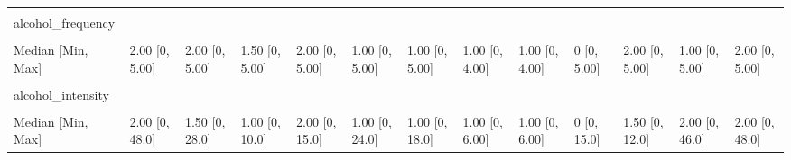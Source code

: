 \documentclass[
  single column]{article}
\begin{document}
\begin{landscape}
\begin{longtable}[t]{lllllllllllll}
\cellcolor{gray!10}{Missing} & \cellcolor{gray!10}{51 (0.2\%)} & \cellcolor{gray!10}{3 (0.2\%)} & \cellcolor{gray!10}{0 (0\%)} & \cellcolor{gray!10}{5 (0.2\%)} & \cellcolor{gray!10}{12 (0.3\%)} & \cellcolor{gray!10}{4 (0.4\%)} & \cellcolor{gray!10}{0 (0\%)} & \cellcolor{gray!10}{0 (0\%)} & \cellcolor{gray!10}{3 (0.5\%)} & \cellcolor{gray!10}{1 (0.2\%)} & \cellcolor{gray!10}{4 (0.5\%)} & \cellcolor{gray!10}{83 (0.3\%)}\\
alcohol\_frequency &  &  &  &  &  &  &  &  &  &  &  & \\
\addlinespace
\cellcolor{gray!10}{Mean (SD)} & \cellcolor{gray!10}{2.05 (1.33)} & \cellcolor{gray!10}{2.20 (1.38)} & \cellcolor{gray!10}{1.66 (1.35)} & \cellcolor{gray!10}{1.99 (1.34)} & \cellcolor{gray!10}{1.62 (1.34)} & \cellcolor{gray!10}{1.37 (1.34)} & \cellcolor{gray!10}{1.32 (1.28)} & \cellcolor{gray!10}{1.55 (1.18)} & \cellcolor{gray!10}{0.112 (0.557)} & \cellcolor{gray!10}{2.02 (1.37)} & \cellcolor{gray!10}{1.51 (1.38)} & \cellcolor{gray!10}{1.92 (1.36)}\\
Median [Min, Max] & 2.00 [0, 5.00] & 2.00 [0, 5.00] & 1.50 [0, 5.00] & 2.00 [0, 5.00] & 1.00 [0, 5.00] & 1.00 [0, 5.00] & 1.00 [0, 4.00] & 1.00 [0, 4.00] & 0 [0, 5.00] & 2.00 [0, 5.00] & 1.00 [0, 5.00] & 2.00 [0, 5.00]\\
\cellcolor{gray!10}{Missing} & \cellcolor{gray!10}{449 (2.1\%)} & \cellcolor{gray!10}{40 (2.9\%)} & \cellcolor{gray!10}{8 (3.0\%)} & \cellcolor{gray!10}{78 (3.9\%)} & \cellcolor{gray!10}{92 (2.5\%)} & \cellcolor{gray!10}{30 (2.7\%)} & \cellcolor{gray!10}{4 (2.9\%)} & \cellcolor{gray!10}{5 (5.7\%)} & \cellcolor{gray!10}{22 (3.3\%)} & \cellcolor{gray!10}{19 (3.3\%)} & \cellcolor{gray!10}{23 (3.1\%)} & \cellcolor{gray!10}{770 (2.4\%)}\\
alcohol\_intensity &  &  &  &  &  &  &  &  &  &  &  & \\
\cellcolor{gray!10}{Mean (SD)} & \cellcolor{gray!10}{2.36 (2.25)} & \cellcolor{gray!10}{1.83 (1.84)} & \cellcolor{gray!10}{1.66 (1.40)} & \cellcolor{gray!10}{2.08 (1.89)} & \cellcolor{gray!10}{1.65 (1.80)} & \cellcolor{gray!10}{1.58 (2.07)} & \cellcolor{gray!10}{1.60 (1.57)} & \cellcolor{gray!10}{1.50 (1.30)} & \cellcolor{gray!10}{0.387 (1.52)} & \cellcolor{gray!10}{1.80 (1.55)} & \cellcolor{gray!10}{2.24 (3.30)} & \cellcolor{gray!10}{2.17 (2.18)}\\
\addlinespace
Median [Min, Max] & 2.00 [0, 48.0] & 1.50 [0, 28.0] & 1.00 [0, 10.0] & 2.00 [0, 15.0] & 1.00 [0, 24.0] & 1.00 [0, 18.0] & 1.00 [0, 6.00] & 1.00 [0, 6.00] & 0 [0, 15.0] & 1.50 [0, 12.0] & 2.00 [0, 46.0] & 2.00 [0, 48.0]\\

\end{longtable}
\end{landscape}
\end{document}
